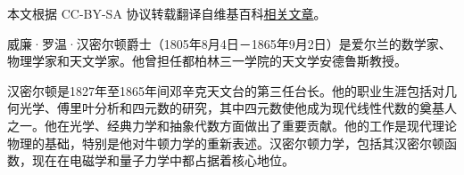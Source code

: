 
本文根据 CC-BY-SA 协议转载翻译自维基百科\href{https://en.wikipedia.org/wiki/William_Rowan_Hamilton}{相关文章}。

威廉·罗温·汉密尔顿爵士（1805年8月4日－1865年9月2日）是爱尔兰的数学家、物理学家和天文学家。他曾担任都柏林三一学院的天文学安德鲁斯教授。

汉密尔顿是1827年至1865年间邓辛克天文台的第三任台长。他的职业生涯包括对几何光学、傅里叶分析和四元数的研究，其中四元数使他成为现代线性代数的奠基人之一。他在光学、经典力学和抽象代数方面做出了重要贡献。他的工作是现代理论物理的基础，特别是他对牛顿力学的重新表述。汉密尔顿力学，包括其汉密尔顿函数，现在在电磁学和量子力学中都占据着核心地位。